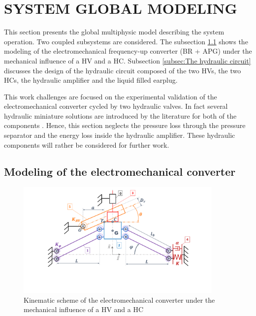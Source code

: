 \documentclass[3p,twocolumn,preprint]{elsarticle}
\begin{document}
\section{SYSTEM GLOBAL MODELING}
\label{sec:SYSTEM MODELING}
This section presents the global multiphysic model describing the system operation. Two coupled subsystems are considered. The subsection \ref{subsec:The electromechanical converter} shows the modeling of the electromechanical frequency-up converter (BR + APG) under the mechanical influence of a HV and a HC. Subsection \ref{subsec:The hydraulic circuit} discusses the design of the hydraulic circuit composed of the two HVs, the two HCs, the hydraulic amplifier and the liquid filled earplug.

This work challenges are focused on the experimental validation of the electromechanical converter cycled by two hydraulic valves. In fact several hydraulic miniature solutions are introduced by the literature for both of the components \cite{Wang2020,Xu2021,Zhu2013}. Hence, this section neglects the pressure loss through the pressure separator and the energy loss inside the hydraulic amplifier. These hydraulic components will rather be considered for further work. 

	\subsection{Modeling of the electromechanical converter}	
	\label{subsec:The electromechanical converter}
\begin{figure}[!htbp]
	\centering
	\captionsetup{justification=centering}
	\includegraphics[trim={0cm 0cm 0cm 0cm},clip, width=0.9\textwidth]{figures/schema_cinematique1.pdf}
	\caption{Kinematic scheme of the electromechanical converter under the mechanical influence of a HV and a HC}
	\label{fig:schema_cinematique1}
\end{figure}
\end{document}
